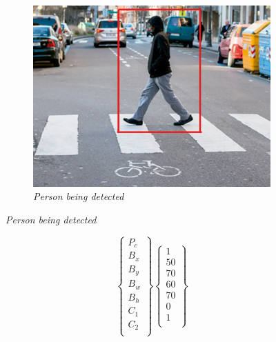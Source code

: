 \begin{figure}[H]
    \centering
    \begin{subfigure}[b]{0.6\textwidth}
        \centering
        \includegraphics[width=\textwidth]{Figures/2. Related Work/person_detected.png}
        \caption{\textit{
                Person being detected
            }}
    \end{subfigure}
\end{figure}

\begin{equation}
    \left\{
    \begin{array}{ll}
        P_{c} \\
        B_{x} \\
        B_{y} \\
        B_{w} \\
        B_{h} \\
        C_{1} \\
        C_{2} \\
    \end{array}
    \right\}
    \left\{
    \begin{array}{ll}
        1  \\
        50 \\
        70 \\
        60 \\
        70 \\
        0  \\
        1  \\
    \end{array}
    \right\}
\end{equation}

